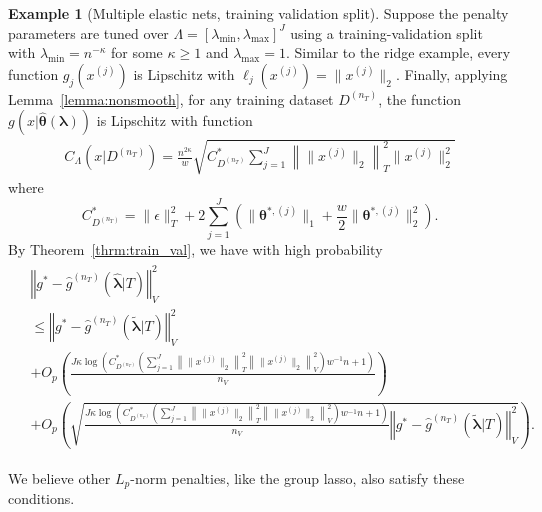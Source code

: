 \documentclass[12pt]{article} %
\theoremstyle{definition}
\newtheorem{example}{Example}
\begin{document}
\begin{example}[Multiple elastic nets, training validation split]
	Suppose the penalty parameters are tuned over $\Lambda = \left [ \lambda_{\min}, \lambda_{\max} \right ]^J$ using a training-validation split with $\lambda_{\min} = n^{-\kappa}$ for some $\kappa \ge 1$ and $\lambda_{\max} = 1$.
	Similar to the ridge example, every function $g_j(x^{(j)})$ is Lipschitz with $\ell_j(x^{(j)}) = \|x^{(j)}\|_2$.
	Finally, applying Lemma~\ref{lemma:nonsmooth}, for any training dataset $D^{(n_T)}$, the function $g(x | \hat{\boldsymbol{\theta}}(\boldsymbol{\lambda}))$ is Lipschitz with function
	\begin{align}
	C_\Lambda \left ( x | D^{(n_T)} \right ) =
	\frac{n^{2\kappa}}{w}
	\sqrt{
	C^*_{D^{(n_T)}}
	\sum_{j = 1}^J
	\left \|
	\|x^{(j)} \|_2
	\right \|_T^2
	\|x^{(j)}\|_2^2
	}
	\label{eq:elastic_lipschitz}
	\end{align}
	where $$
	C^*_{D^{(n_T)}} = 
	\|\epsilon\|_{T}^{2}
		+2\sum_{j=1}^J
		\left (
		\|\boldsymbol{\theta}^{*,(j)}\|_1
		+ \frac{w}{2}\|\boldsymbol{\theta}^{*,(j)}\|_2^2
		\right )
	.$$
	By Theorem~\ref{thrm:train_val}, we have with high probability
	\begin{align}
	\begin{split}
	&\left\Vert g^* - \hat{g}^{(n_T)}( \hat{\boldsymbol{\lambda}} | T) \right\Vert _{V}^2\\
	&\le \left\Vert g^* - \hat{g}^{(n_T)}( \tilde{\boldsymbol{\lambda}} | T) \right \Vert^2_{V}\\
	& + O_p\left (
	\frac{J \kappa
	\log \left (
	C^*_{D^{(n_T)}}
	\left (
	\sum_{j=1}^J
	\left \| \|x^{(j)}\|_2 \right \|_T^2 \left \| \|x^{(j)}\|_2 \right \|_V^2
	\right )
	w^{-1} n + 1
	\right )}{n_{V}}
	\right ) \\
	& + O_p\left(
	\sqrt{\frac{J \kappa
		\log \left (
		C^*_{D^{(n_T)}}
		\left (
		\sum_{j=1}^J
		\left \| \|x^{(j)}\|_2 \right \|_T^2 \left \| \|x^{(j)}\|_2 \right \|_V^2
		\right )
		w^{-1} n + 1
		\right )}{n_{V}}\left\Vert g^* - \hat{g}^{(n_T)}( \tilde{\boldsymbol{\lambda}} | T)\right\Vert_{V}^2}
	\right ).
	\end{split}
	\end{align}
\end{example}

We believe other $L_p$-norm penalties, like the group lasso, also satisfy these conditions.
\end{document}
